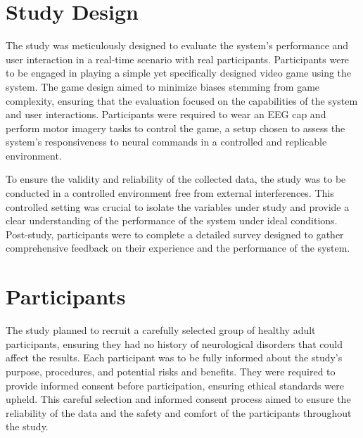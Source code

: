 \section{Study Design}
The study was meticulously designed to evaluate the system's performance and user interaction in a real-time scenario with real participants. Participants were to be engaged in playing a simple yet specifically designed video game using the system. The game design aimed to minimize biases stemming from game complexity, ensuring that the evaluation focused on the capabilities of the system and user interactions. Participants were required to wear an EEG cap and perform motor imagery tasks to control the game, a setup chosen to assess the system's responsiveness to neural commands in a controlled and replicable environment.

To ensure the validity and reliability of the collected data, the study was to be conducted in a controlled environment free from external interferences. This controlled setting was crucial to isolate the variables under study and provide a clear understanding of the performance of the system under ideal conditions. Post-study, participants were to complete a detailed survey designed to gather comprehensive feedback on their experience and the performance of the system.

\section{Participants}
The study planned to recruit a carefully selected group of healthy adult participants, ensuring they had no history of neurological disorders that could affect the results. 
Each participant was to be fully informed about the study's purpose, procedures, and potential risks and benefits. 
They were required to provide informed consent before participation, ensuring ethical standards were upheld. 
This careful selection and informed consent process aimed to ensure the reliability of the data and the safety and comfort of the participants throughout the study.

